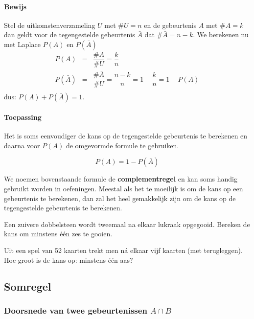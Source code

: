 \documentclass[12pt,twoside]{article}
\begin{document}
\paragraph*{Bewijs} Stel de uitkomstenverzameling $U$ met $\#U = n$ en de gebeurtenis $A$ met $\#A = k$ dan
geldt voor de tegengestelde gebeurtenis $\bar{A}$ dat $\#\bar{A} = n - k$.
We berekenen nu met Laplace $P(A)$ en $P(\bar{A})$
\begin{eqnarray*}
  P(A)&=&\dfrac{\#A}{\#U}=\dfrac{k}{n}\\
  P(\bar{A})&=&\dfrac{\#\bar{A}}{\#U}=\dfrac{n-k}{n}=1-\dfrac{k}{n}=1-P(A)\\
\end{eqnarray*}
dus: $P(A)+P(\bar{A})=1$.

\paragraph*{Toepassing}
Het is soms eenvoudiger de kans op de tegengestelde gebeurtenis te berekenen en
daarna voor $P(A)$ de omgevormde formule te gebruiken.\\
\begin{mdframed}
$$P(A)=1-P(\bar{A})$$
\end{mdframed}

We noemen bovenstaande formule de {\bf complementregel} en kan soms handig gebruikt worden in oefeningen. Meestal als het te moeilijk is om de kans op een gebeurtenis te berekenen, dan zal het heel gemakkelijk zijn om de kans op de tegengestelde gebeurtenis te berekenen.

\begin{oefening}
Een zuivere dobbelsteen wordt tweemaal na elkaar lukraak opgegooid. Bereken de
kans om minstens één zes te gooien.
\end{oefening}

\begin{oefening}
Uit een spel van 52 kaarten trekt men ná elkaar vijf kaarten (met terugleggen). Hoe
groot is de kans op: minstens één aas?
\end{oefening}

\subsection{Somregel}

\subsubsection{Doorsnede van twee gebeurtenissen $A\cap B$}
\end{document}
